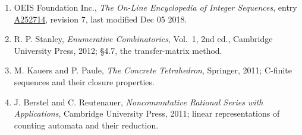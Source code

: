 \documentclass[11pt]{article}
\theoremstyle{definition}
\begin{document}
\begin{enumerate}

\item OEIS Foundation Inc., \emph{The On-Line Encyclopedia of Integer Sequences}, entry \href{https://oeis.org/A252714}{A252714}, revision 7, last modified Dec 05 2018.

\item R. P. Stanley, \emph{Enumerative Combinatorics}, Vol.~1, 2nd ed., Cambridge University Press, 2012; \S4.7, the transfer-matrix method.

\item M. Kauers and P. Paule, \emph{The Concrete Tetrahedron}, Springer, 2011; C-finite sequences and their closure properties.

\item J. Berstel and C. Reutenauer, \emph{Noncommutative Rational Series with Applications}, Cambridge University Press, 2011; linear representations of counting automata and their reduction.

\end{enumerate}
\end{document}
